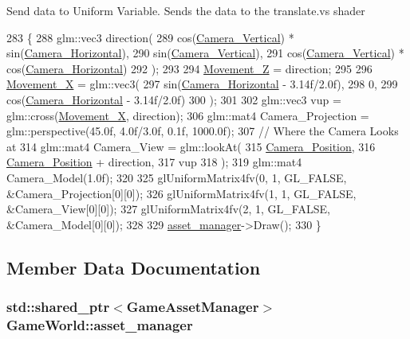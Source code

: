 Send data to Uniform Variable. Sends the data to the translate.\+vs shader
\begin{DoxyCode}
283                      \{
288         glm::vec3 direction(
289         cos(\hyperlink{classGameWorld_a26658e739c4d267b1be35ed820089931}{Camera\_Vertical}) * sin(\hyperlink{classGameWorld_a7f4911dda9b3b4e4eb03ece87e16cd96}{Camera\_Horizontal}),
290         sin(\hyperlink{classGameWorld_a26658e739c4d267b1be35ed820089931}{Camera\_Vertical}),
291         cos(\hyperlink{classGameWorld_a26658e739c4d267b1be35ed820089931}{Camera\_Vertical}) * cos(\hyperlink{classGameWorld_a7f4911dda9b3b4e4eb03ece87e16cd96}{Camera\_Horizontal})
292     );
293 
294     \hyperlink{classGameWorld_a8dd30ba92e7fa9b9b05075e31d1e7dd8}{Movement\_Z} = direction;
295 
296     \hyperlink{classGameWorld_a968eb29424b68f7cd79a5896c62e944d}{Movement\_X} = glm::vec3(
297         sin(\hyperlink{classGameWorld_a7f4911dda9b3b4e4eb03ece87e16cd96}{Camera\_Horizontal} - 3.14f/2.0f),
298         0,
299         cos(\hyperlink{classGameWorld_a7f4911dda9b3b4e4eb03ece87e16cd96}{Camera\_Horizontal} - 3.14f/2.0f)
300     );
301 
302     glm::vec3 vup = glm::cross(\hyperlink{classGameWorld_a968eb29424b68f7cd79a5896c62e944d}{Movement\_X}, direction);
306     glm::mat4 Camera\_Projection = glm::perspective(45.0f, 4.0f/3.0f, 0.1f, 1000.0f);
307         \textcolor{comment}{// Where the Camera Looks at}
314 \textcolor{comment}{}    glm::mat4 Camera\_View = glm::lookAt(
315         \hyperlink{classGameWorld_ad80e597474ea4c52a583e81788187571}{Camera\_Position},
316         \hyperlink{classGameWorld_ad80e597474ea4c52a583e81788187571}{Camera\_Position} + direction,
317         vup
318     );
319     glm::mat4 Camera\_Model(1.0f);
320 
325     glUniformMatrix4fv(0, 1, GL\_FALSE, &Camera\_Projection[0][0]);
326     glUniformMatrix4fv(1, 1, GL\_FALSE, &Camera\_View[0][0]);
327     glUniformMatrix4fv(2, 1, GL\_FALSE, &Camera\_Model[0][0]);
328 
329         \hyperlink{classGameWorld_aec5c0bca4fb5a41e4aac2dce2871266d}{asset\_manager}->Draw();
330 \}
\end{DoxyCode}


\subsection{Member Data Documentation}
\hypertarget{classGameWorld_aec5c0bca4fb5a41e4aac2dce2871266d}{}
\subsubsection[{asset\+\_\+manager}]{\setlength{\rightskip}{0pt plus 5cm}std\+::shared\+\_\+ptr$<${\bf Game\+Asset\+Manager}$>$ Game\+World\+::asset\+\_\+manager\hspace{0.3cm}{\ttfamily [private]}}\label{classGameWorld_aec5c0bca4fb5a41e4aac2dce2871266d}
\hypertarget{classGameWorld_a7f4911dda9b3b4e4eb03ece87e16cd96}{}
